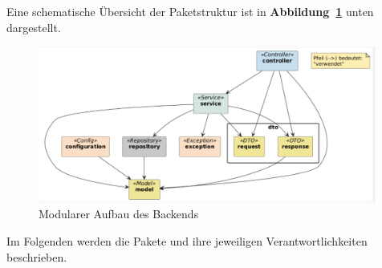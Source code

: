\noindent Eine schematische Übersicht der Paketstruktur ist in \textbf{Abbildung~\ref{fig:package-structure}} unten dargestellt.
\begin{figure}[H]
	\centering
	\includegraphics[width=0.99\textwidth]{images/backend_structure.png}
	\caption{Modularer Aufbau des Backends}
	\label{fig:package-structure}
\end{figure} 
\noindent Im Folgenden werden die Pakete und ihre jeweiligen Verantwortlichkeiten beschrieben.
